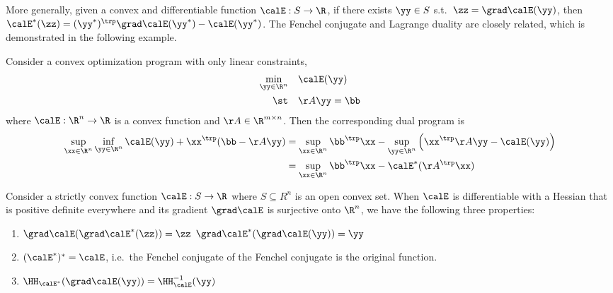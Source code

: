 More generally, given a convex and differentiable function $\calE:S\to\R$, if there exists $\yy\in S$ s.t.\ $\zz = \grad\calE(\yy)$, then $\calE^*(\zz) = (\yy^*)^\trp\grad\calE(\yy^*)-\calE(\yy^*)$.
The Fenchel conjugate and Lagrange duality are closely related, which
is demonstrated in the following example.


\begin{example}
  Consider a convex optimization program with only linear constraints,
  \begin{align*}
    \min_{\yy\in\R^n}\quad & \calE(\yy) \\
    \st\quad  & \AA\yy = \bb
  \end{align*}
  where $\calE:\R^n\to\R$ is a convex function and $\AA\in\R^{m\times n}$.
  Then the corresponding dual program is
  \begin{align*}
    \sup_{\xx\in\R^n}\inf_{\yy\in\R^n} \calE(\yy) + \xx^\trp(\bb-\AA\yy)
    &= \sup_{\xx\in\R^n}\bb^\trp\xx - \sup_{\yy\in\R^n} \left(\xx^\trp\AA\yy - \calE(\yy)\right) \\
    &= \sup_{\xx\in\R^n}\bb^\trp\xx - \calE^*(\AA^\trp\xx) \\
  \end{align*}
\end{example}

\begin{theorem}
  \label{thm:conjugate}
  Consider a strictly convex function ${\calE : S \to \R}$ where $S \subseteq
  R^n$ is an open convex set. When $\calE$ is differentiable with a Hessian
  that is positive definite everywhere and its gradient $\grad \calE$
is surjective onto
  $\R^n$, we have the following three properties:
  \begin{enumerate}
  \item $\grad\calE(\grad\calE^*(\zz))=\zz$  $\grad\calE^*(\grad\calE(\yy)) = \yy$ \label{enu:gradmap}
  \item $(\calE^*)^* = \calE$, i.e.\ the Fenchel conjugate of the \label{enu:doubleconj}
      Fenchel conjugate is the original function.
  \item $\HH_{\calE^*}(\grad\calE(\yy)) = \HH_{\calE}^{-1}(\yy)$ \label{enu:hessianmap}
  \end{enumerate}
\end{theorem}

